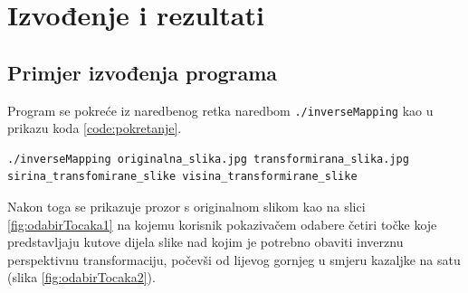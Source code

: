 \chapter{Izvođenje i rezultati}
\label{ch:rezultati}

\section{Primjer izvođenja programa}
\label{sec:izvodjenje}

Program se pokreće iz naredbenog retka naredbom \lstinline!./inverseMapping! kao u prikazu koda \ref{code:pokretanje}.
\begin{lstlisting}[label={code:pokretanje}, caption={Pokretanje programa}]
./inverseMapping originalna_slika.jpg transformirana_slika.jpg sirina_transfomirane_slike visina_transformirane_slike
\end{lstlisting}

Nakon toga se prikazuje prozor s originalnom slikom kao na slici \ref{fig:odabirTocaka1} na kojemu korisnik pokazivačem odabere četiri točke koje predstavljaju kutove dijela slike nad kojim je potrebno obaviti inverznu perspektivnu transformaciju, počevši od lijevog gornjeg u smjeru kazaljke na satu (slika \ref{fig:odabirTocaka2}).

